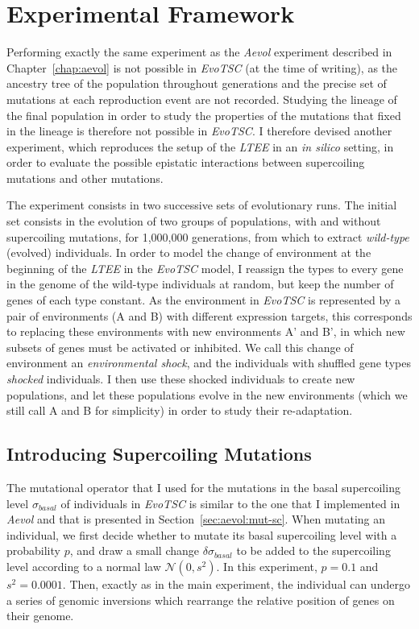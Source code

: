 \section{Experimental Framework}

Performing exactly the same experiment as the \emph{Aevol} experiment described in Chapter~\ref{chap:aevol} is not possible in \emph{EvoTSC} (at the time of writing), as the ancestry tree of the population throughout generations and the precise set of mutations at each reproduction event are not recorded.
Studying the lineage of the final population in order to study the properties of the mutations that fixed in the lineage is therefore not possible in \emph{EvoTSC}.
I therefore devised another experiment, which reproduces the setup of the \emph{LTEE} in an \emph{in silico} setting, in order to evaluate the possible epistatic interactions between supercoiling mutations and other mutations.

The experiment consists in two successive sets of evolutionary runs.
The initial set consists in the evolution of two groups of populations, with and without supercoiling mutations, for 1,000,000 generations, from which to extract \emph{wild-type} (evolved) individuals.
In order to model the change of environment at the beginning of the \emph{LTEE} in the \emph{EvoTSC} model, I reassign the types to every gene in the genome of the wild-type individuals at random, but keep the number of genes of each type constant.
As the environment in \emph{EvoTSC} is represented by a pair of environments (A and B) with different expression targets, this corresponds to replacing these environments with new environments A' and B', in which new subsets of genes must be activated or inhibited.
We call this change of environment an \emph{environmental shock}, and the individuals with shuffled gene types \emph{shocked} individuals.
I then use these shocked individuals to create new populations, and let these populations evolve in the new environments (which we still call A and B for simplicity) in order to study their re-adaptation.

\subsection{Introducing Supercoiling Mutations}

The mutational operator that I used for the mutations in the basal supercoiling level $\sigma_{basal}$ of individuals in \emph{EvoTSC} is similar to the one that I implemented in \emph{Aevol} and that is presented in Section~\ref{sec:aevol:mut-sc}.
When mutating an individual, we first decide whether to mutate its basal supercoiling level with a probability $p$, and draw a small change $\delta\sigma_{basal}$ to be added to the supercoiling level according to a normal law $\mathcal{N}(0, s^2)$.
In this experiment, $p=0.1$ and $s^2=0.0001$.
Then, exactly as in the main experiment, the individual can undergo a series of genomic inversions which rearrange the relative position of genes on their genome.


